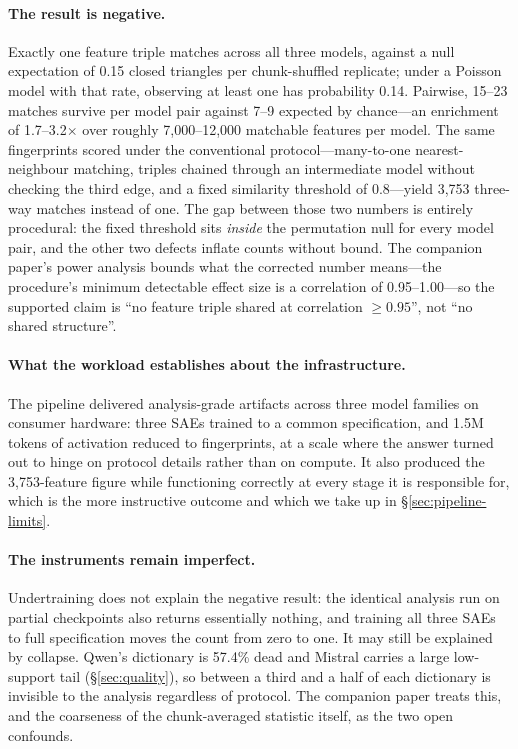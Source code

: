 \documentclass[11pt]{article}
\begin{document}
\paragraph{The result is negative.} Exactly one feature triple matches across all three models, against a null expectation of 0.15 closed triangles per chunk-shuffled replicate; under a Poisson model with that rate, observing at least one has probability 0.14. Pairwise, 15--23 matches survive per model pair against 7--9 expected by chance---an enrichment of 1.7--3.2$\times$ over roughly 7,000--12,000 matchable features per model. The same fingerprints scored under the conventional protocol---many-to-one nearest-neighbour matching, triples chained through an intermediate model without checking the third edge, and a fixed similarity threshold of 0.8---yield 3,753 three-way matches instead of one. The gap between those two numbers is entirely procedural: the fixed threshold sits \emph{inside} the permutation null for every model pair, and the other two defects inflate counts without bound. The companion paper's power analysis bounds what the corrected number means---the procedure's minimum detectable effect size is a correlation of 0.95--1.00---so the supported claim is ``no feature triple shared at correlation $\geq 0.95$'', not ``no shared structure''.

\paragraph{What the workload establishes about the infrastructure.} The pipeline delivered analysis-grade artifacts across three model families on consumer hardware: three SAEs trained to a common specification, and 1.5M tokens of activation reduced to fingerprints, at a scale where the answer turned out to hinge on protocol details rather than on compute. It also produced the 3,753-feature figure while functioning correctly at every stage it is responsible for, which is the more instructive outcome and which we take up in \S\ref{sec:pipeline-limits}.

\paragraph{The instruments remain imperfect.} Undertraining does not explain the negative result: the identical analysis run on partial checkpoints also returns essentially nothing, and training all three SAEs to full specification moves the count from zero to one. It may still be explained by collapse. Qwen's dictionary is 57.4\% dead and Mistral carries a large low-support tail (\S\ref{sec:quality}), so between a third and a half of each dictionary is invisible to the analysis regardless of protocol. The companion paper treats this, and the coarseness of the chunk-averaged statistic itself, as the two open confounds.
\end{document}
